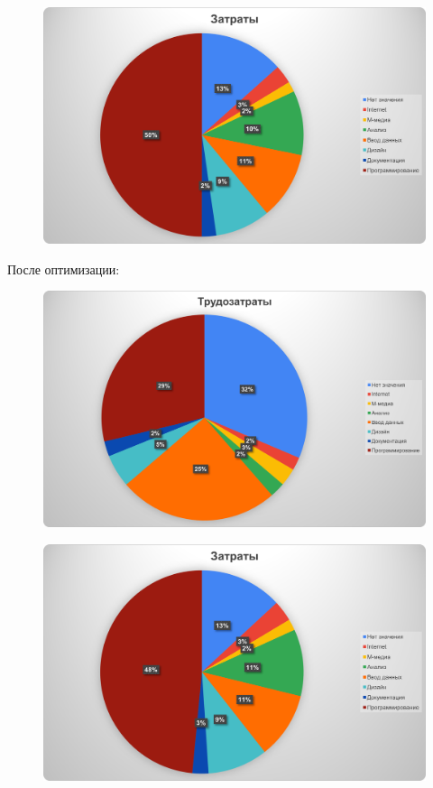 \begin{figure}[H]
	\begin{center}
		\includegraphics[width=\textwidth]{imgs/task_3_5.png}
	\end{center}
\end{figure}

После оптимизации:

\begin{figure}[H]
	\begin{center}
		\includegraphics[width=\textwidth]{imgs/task_3_6.png}
	\end{center}
\end{figure}

\begin{figure}[H]
	\begin{center}
		\includegraphics[width=\textwidth]{imgs/task_3_7.png}
	\end{center}
\end{figure}


